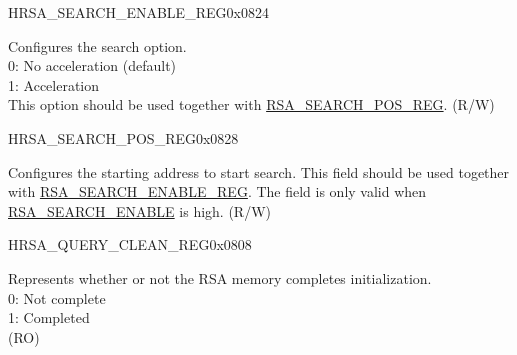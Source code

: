 \begin{register}{H}{RSA\_SEARCH\_ENABLE\_REG}{0x0824}\label{regdesc:RSASEARCHENABLEREG}
%
%
\regnewline%
\begin{regdesc}\begin{reglist}
\label{fielddesc:RSASEARCHENABLE}\item [RSA\_SEARCH\_ENABLE] Configures the search option. \\
0: No acceleration (default)\\
1: Acceleration\\
This option should be used together with \hyperref[regdesc:RSASEARCHPOSREG]{RSA\_SEARCH\_POS\_REG}. (R/W)
\end{reglist}\end{regdesc}
\end{register}


\begin{register}{H}{RSA\_SEARCH\_POS\_REG}{0x0828}\label{regdesc:RSASEARCHPOSREG}
%
%
\regnewline%
\begin{regdesc}\begin{reglist}
\label{fielddesc:RSASEARCHPOS}\item [RSA\_SEARCH\_POS] Configures the starting address to start search. This field should be used together with \hyperref[regdesc:RSASEARCHENABLEREG]{RSA\_SEARCH\_ENABLE\_REG}. The field is only valid when \hyperref[fielddesc:RSASEARCHENABLE]{RSA\_SEARCH\_ENABLE} is high. (R/W)
\end{reglist}\end{regdesc}
\end{register}


\begin{register}{H}{RSA\_QUERY\_CLEAN\_REG}{0x0808}\label{regdesc:RSAQUERYCLEANREG}
%
%
\regnewline%
\begin{regdesc}\begin{reglist}
\label{fielddesc:RSAQUERYCLEAN}\item [RSA\_QUERY\_CLEAN] Represents whether or not the RSA memory completes initialization.\\
0: Not complete\\
1: Completed\\
 (RO)
\end{reglist}\end{regdesc}
\end{register}


